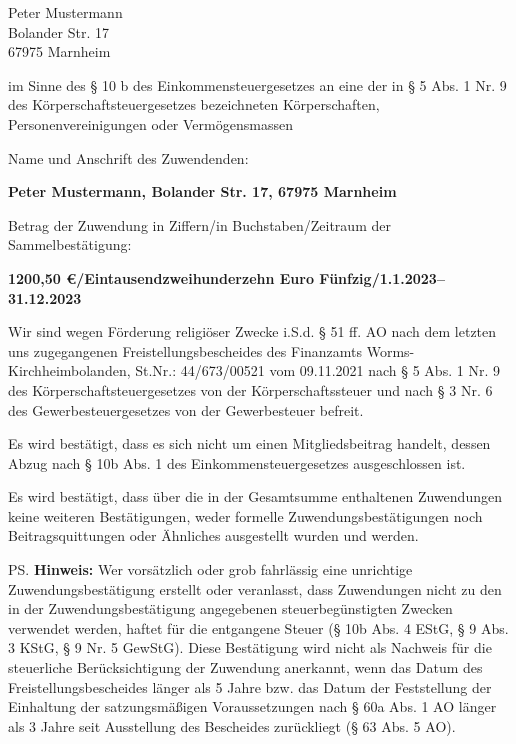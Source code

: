 \documentclass[fontsize=11pt, twoside]{scrlttr2}
\begin{document}

\begin{letter}{Peter Mustermann\\Bolander Str. 17\\67975 Marnheim} %

\opening{im Sinne des § 10 b des Einkommensteuergesetzes an eine der in § 5 Abs. 1 Nr. 9 des Körperschaftsteuergesetzes bezeichneten Körperschaften, Personenvereinigungen oder Vermögensmassen}

Name und Anschrift des Zuwendenden:

\textbf{Peter Mustermann, Bolander Str. 17, 67975 Marnheim} %

Betrag der Zuwendung in Ziffern/in Buchstaben/Zeitraum der Sammelbestätigung:

\textbf{1200,50 €/Eintausendzweihunderzehn Euro Fünfzig/1.1.2023–31.12.2023} %

Wir sind wegen Förderung religiöser Zwecke i.S.d. § 51 ff. AO nach dem letzten uns zugegangenen Freistellungsbescheides des Finanzamts Worms-Kirchheimbolanden, St.Nr.: 44/673/00521 vom 09.11.2021 nach § 5 Abs. 1 Nr. 9 des Körperschaftsteuergesetzes von der Körperschaftssteuer und nach § 3 Nr. 6 des Gewerbesteuergesetzes von der Gewerbesteuer befreit.

Es wird bestätigt, dass es sich nicht um einen Mitgliedsbeitrag handelt, dessen Abzug nach § 10b Abs. 1 des Einkommensteuergesetzes ausgeschlossen ist.

Es wird bestätigt, dass über die in der Gesamtsumme enthaltenen Zuwendungen keine weiteren Bestätigungen, weder formelle Zuwendungsbestätigungen noch Beitragsquittungen oder Ähnliches ausgestellt wurden und werden.
\enlargethispage{5\baselineskip}
\closing{}

\ps\footnotesize
\textbf{Hinweis:} Wer vorsätzlich oder grob fahrlässig eine unrichtige Zuwendungsbestätigung erstellt oder veranlasst, dass Zuwendungen nicht zu den in der Zuwendungsbestätigung angegebenen steuerbegünstigten Zwecken verwendet werden, haftet für die entgangene Steuer (§ 10b Abs. 4 EStG, § 9 Abs. 3 KStG, § 9 Nr. 5 GewStG). Diese Bestätigung wird nicht als Nachweis für die steuerliche Berücksichtigung der Zuwendung anerkannt, wenn das Datum des Freistellungsbescheides länger als 5 Jahre bzw. das Datum der Feststellung der Einhaltung der satzungsmäßigen Voraussetzungen nach § 60a Abs. 1 AO länger als 3 Jahre seit Ausstellung des Bescheides zurückliegt (§ 63 Abs. 5 AO).


\end{letter}
\end{document}
